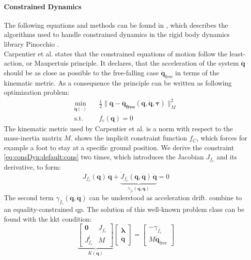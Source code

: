 \paragraph{Constrained Dynamics}
The following equations and methods can be found in \cite{carpentier_2021}, which describes the algorithms used to handle constrained dynamics in the rigid body dynamics library Pinocchio \cite{pinocchioweb}.
\\
Carpentier et al. states that the constrained equations of motion follow the least-action, or Maupertuis principle.
It declares, that the acceleration of the system $\bm{\ddot q}$ should be as close as possible to the free-falling case $\bm{\ddot q}_\text{free}$ \cite{carpentier_2021} in terms of the kinematic metric.
As a consequence the principle can be written as following optimization problem: 
\begin{subequations}
  \label{eq:consDyn:default}
  \begin{align}
    \min_{\bm {\ddot q}(\cdot)} \quad & \frac 1 2 \| \bm{\ddot q} - \bm{\ddot q_\text{free}}(\bm q, \bm{\dot q}, \bm \tau) \|^2_M \label{eq:consDyn:default:obj} \\
    \text{s.t.} \quad & f_c(\bm q) = 0 \label{eq:consDyn:default:cons}
  \end{align}
\end{subequations}
The kinematic metric used by Carpentier et al. is a norm with respect to the mass-inertia matrix $M$.
 shows the implicit constraint function $f_C$, which forces for example a foot to stay at a specific ground position.
We derive the constraint \cref{eq:consDyn:default:cons} two times, which introduces the Jacobian $J_{f_c}$ and its derivative, to form:
\begin{equation}
  J_{f_c}(\bm{q})\,\bm{\dot q} + \underbrace{\dot{J}_{f_c}(\bm{q},\bm{\dot q})\,\bm{\dot q}}_{\gamma_{f_c}(\bm{q},\bm{\dot q})} = 0
  \label{eq:consDyn:default:jacobian}
\end{equation}
The second term $\gamma_{f_c}(\bm{q},\bm{\dot q})$ can be understood as acceleration drift.
 combine to an equality-constrained \acrfull{qp}.
The solution of this well-known problem class can be found with the \acrfull{kkt} condition:
\begin{equation}
  \underbrace{\begin{bmatrix}
  \mathbf{0} & J_{f_c} \\
  J_{f_c}^{t} & M
  \end{bmatrix}}_{K(\bm{q})}
  \begin{bmatrix}
  \bm \lambda \\
  \bm{\ddot q}
  \end{bmatrix}
  =
  \begin{bmatrix}
  -\gamma_{f_c} \\
  M \bm{\ddot q}_{\mathrm{free}}
  \end{bmatrix}
  \label{eq:consDyn:default:KKT}
\end{equation}
